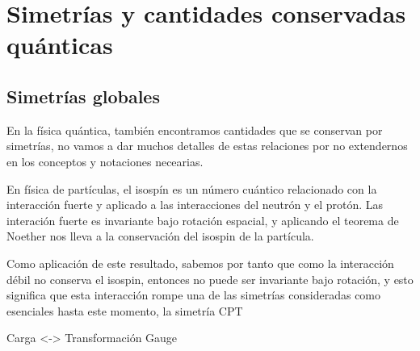 
\chapter{Simetrías y cantidades conservadas quánticas}\label{ch:simetrias-y-cantidades-conservadas-quanticas}

\section{Simetrías globales}\label{sec:simetrias-globales}

En la física quántica, también encontramos cantidades que se conservan por simetrías, no vamos a dar muchos detalles de estas relaciones por no extendernos en los conceptos y notaciones necearias.

En física de partículas, el isospín es un número cuántico relacionado con la interacción fuerte y aplicado a las interacciones del neutrón y el protón.
Las interación fuerte es invariante bajo rotación espacial, y aplicando el teorema de Noether nos lleva a la conservación del isospin de la partícula.

Como aplicación de este resultado, sabemos por tanto que como la interacción débil no conserva el isospin, entonces no puede ser invariante bajo rotación, y esto significa que esta interacción rompe una de las simetrías consideradas como esenciales hasta este momento, la simetría CPT

Carga <-> Transformación Gauge